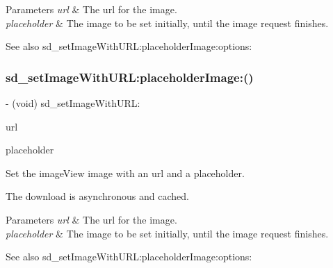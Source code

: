\begin{DoxyParams}{Parameters}
{\em url} & The url for the image. \\
\hline
{\em placeholder} & The image to be set initially, until the image request finishes. \\
\hline
\end{DoxyParams}
\begin{DoxySeeAlso}{See also}
sd\+\_\+set\+Image\+With\+U\+R\+L\+:placeholder\+Image\+:options\+: 
\end{DoxySeeAlso}
\mbox{\label{category_u_i_image_view_07_web_cache_08_a82e4106ff7460eff97dae9b79a539c41}} 
\subsubsection{\texorpdfstring{sd\+\_\+set\+Image\+With\+U\+R\+L\+:placeholder\+Image\+:()}{sd\_setImageWithURL:placeholderImage:()}\hspace{0.1cm}{\footnotesize\ttfamily [3/3]}}
{\footnotesize\ttfamily -\/ (void) sd\+\_\+set\+Image\+With\+U\+R\+L\+: \begin{DoxyParamCaption}\item[{(N\+S\+U\+RL $\ast$)}]{url }\item[{placeholderImage:(U\+I\+Image $\ast$)}]{placeholder }\end{DoxyParamCaption}}

Set the image\+View {\ttfamily image} with an {\ttfamily url} and a placeholder.

The download is asynchronous and cached.


\begin{DoxyParams}{Parameters}
{\em url} & The url for the image. \\
\hline
{\em placeholder} & The image to be set initially, until the image request finishes. \\
\hline
\end{DoxyParams}
\begin{DoxySeeAlso}{See also}
sd\+\_\+set\+Image\+With\+U\+R\+L\+:placeholder\+Image\+:options\+: 
\end{DoxySeeAlso}
\mbox{\label{category_u_i_image_view_07_web_cache_08_afa4e73d2ffe8ee7c60b870a6730b7afd}} 
